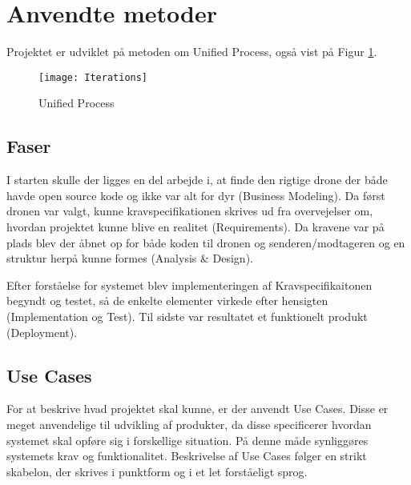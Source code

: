 \documentclass[Main]{subfiles}
\begin{document}
\section{Anvendte metoder}

Projektet er udviklet på metoden om Unified Process\cite[s. 74]{Larman}, også vist på Figur \ref{Fig:UP}.

\begin{figure}[H]
\centering
\texttt{[image: Iterations]}
\caption{Unified Process}
\label{Fig:UP}
\end{figure}



\subsection{Faser}
I starten skulle der ligges en del arbejde i, at finde den rigtige drone der både havde open source kode og ikke var alt for dyr (Business Modeling).
Da først dronen var valgt, kunne kravspecifikationen\cite{Kravspec} skrives ud fra overvejelser om, hvordan projektet kunne blive en realitet (Requirements).
Da kravene var på plads blev der åbnet op for både koden til dronen og senderen/modtageren og en struktur herpå kunne formes (Analysis \& Design).

Efter forståelse for systemet blev implementeringen af Kravspecifikaitonen begyndt og testet, så de enkelte elementer virkede efter hensigten (Implementation og Test).
Til sidste var resultatet et funktionelt produkt (Deployment).




\subsection{Use Cases}
For at beskrive hvad projektet skal kunne, er der anvendt Use Cases.
Disse er meget anvendelige til udvikling af produkter, da disse specificerer hvordan systemet skal opføre sig i forskellige situation.
På denne måde synliggøres systemets krav og funktionalitet.
Beskrivelse af Use Cases følger en strikt skabelon, der skrives i punktform og i et let forståeligt sprog.
\end{document}
